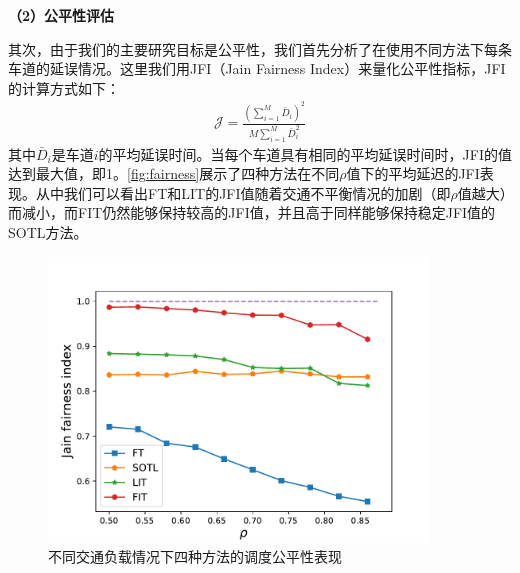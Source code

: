 \textbf{（2）公平性评估}

其次，由于我们的主要研究目标是公平性，我们首先分析了在使用不同方法下每条车道的延误情况。这里我们用JFI（Jain Fairness Index）来量化公平性指标，JFI的计算方式如下：
\begin{align}
    \mathcal{J}=\frac{\left(\sum_{i=1}^{M} \bar{D}_{i}\right)^{2}}{M \sum_{i=1}^{M} \bar{D}_{i}^{2}}
\end{align}
其中$\bar{D}_{i}$是车道$i$的平均延误时间。当每个车道具有相同的平均延误时间时，JFI的值达到最大值，即1。\autoref{fig:fairness}展示了四种方法在不同$\rho$值下的平均延迟的JFI表现。从中我们可以看出FT和LIT的JFI值随着交通不平衡情况的加剧（即$\rho$值越大）而减小，而FIT仍然能够保持较高的JFI值，并且高于同样能够保持稳定JFI值的SOTL方法。
\begin{figure}[htb]
    \includegraphics[width=0.9\textwidth]{fig/fairness.pdf}
    \caption{不同交通负载情况下四种方法的调度公平性表现}
    \label{fig:fairness}
\end{figure}

